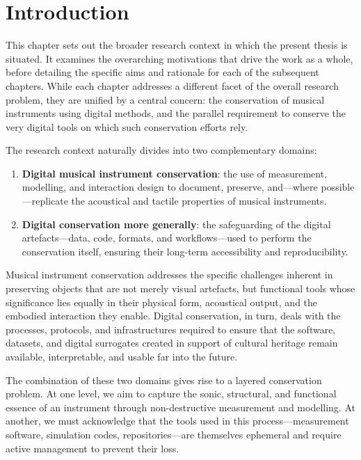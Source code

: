 \section{Introduction}

This chapter sets out the broader research context in which the present thesis is situated. It examines the overarching motivations that drive the work as a whole, before detailing the specific aims and rationale for each of the subsequent chapters. While each chapter addresses a different facet of the overall research problem, they are unified by a central concern: the conservation of musical instruments using digital methods, and the parallel requirement to conserve the very digital tools on which such conservation efforts rely.

The research context naturally divides into two complementary domains:

\begin{enumerate}
    \item \textbf{Digital musical instrument conservation}: the use of measurement, modelling, and interaction design to document, preserve, and—where possible—replicate the acoustical and tactile properties of musical instruments.
    \item \textbf{Digital conservation more generally}: the safeguarding of the digital artefacts—data, code, formats, and workflows—used to perform the conservation itself, ensuring their long-term accessibility and reproducibility.
\end{enumerate}

Musical instrument conservation addresses the specific challenges inherent in preserving objects that are not merely visual artefacts, but functional tools whose significance lies equally in their physical form, acoustical output, and the embodied interaction they enable. Digital conservation, in turn, deals with the processes, protocols, and infrastructures required to ensure that the software, datasets, and digital surrogates created in support of cultural heritage remain available, interpretable, and usable far into the future.

The combination of these two domains gives rise to a layered conservation problem. At one level, we aim to capture the sonic, structural, and functional essence of an instrument through non-destructive measurement and modelling. At another, we must acknowledge that the tools used in this process—measurement software, simulation codes, repositories—are themselves ephemeral and require active management to prevent their loss.

